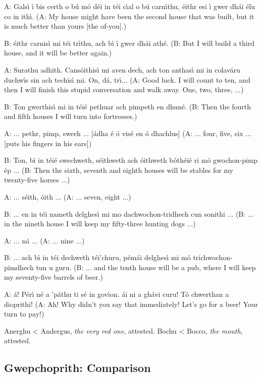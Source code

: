 A: Gals\'{\i} \'{\i} bis certh o b\'{u} m\'{o} d\'{e}i in t\'{e}i c\'{\i}al o b\'{u} carn\'{\i}thu, \'{e}ithr esi \'{\i} gwer dh\'{a}i \'{e}lu co in ith\'{\i}.
(A: My house might have been the second house that was built, but it is much better than yours [the of-you].)

B: \'{e}ithr carnis\'{\i} mi t\'{e}i tr\'{\i}thu, ach b\'{\i} \'{\i} gwer dh\'{a}i ath\'{e}.
(B: But I will build a third house, and it will be better again.)

A: Surathu adhith. Cans\'{o}ithis\'{\i} mi aven dech, ach ton anthas\'{\i} mi in colav\'{a}ru duchw\'{\i}s sin ach techis\'{\i} mi. On, d\'{a}, tr\'{\i}...
(A: Good luck. I will count to ten, and then I will finish this stupid conversation and walk away. One, two, three, ...)

B: Ton gwerthis\'{\i} mi in t\'{e}i\'{e} pethuar ach pimpeth en dhun\'{e}.
(B: Then the fourth and fifth houses I will turn into fortresses.)

A: ... pethr, pimp, swech ... [\'{a}dha \'{e} \'{o} vis\'{e} en \'{o} dhachlus]
(A: ... four, five, six ... [puts his fingers in his ears])

B: Ton, b\'{\i} in t\'{e}i\'{e} swechweth, s\'{e}ithweth ach \'{o}ithweth b\'{o}th\'{e}i\'{e} ri m\'{o} gwochon-pimp \'{e}p ...
(B: Then the sixth, seventh and eighth houses will be stables for my twenty-five horses ...)

A: ... s\'{e}ith, \'{o}ith ...
(A: ... seven, eight ...)

B: ... en in t\'{e}i nameth delghes\'{\i} mi mo dachwochon-tridhech cun sonithi ...
(B: ... in the nineth house I will keep my fifty-three hunting dogs ...)

A: ... n\'{a} ...
(A: ... nine ...)

B: ... ach b\'{\i} in t\'{e}i dechweth t\'{e}i'churu, p\'{e}m\'{a}i delghes\'{\i} mi m\'{o} trichwochon-pimdhech tun u guru.
(B: ... and the tenth house will be a pub, where I will keep my seventy-five barrels of beer.)

A: \'{a}! P\'{e}r\'{\i} n\'{e} a 'p\'{a}thu ti s\'{e} in gov\'{\i}on. \'{a}i ni a gh\'{a}vi curu! T\'{o} chwerthan a dioprithi!
(A: Ah! Why didn't you say that immediately! Let's go for a beer! Your turn to pay!)

Anerghu < Andergus, \textit{the very red one}, attested.
Bochu < Bocco, \textit{the mouth}, attested.

\subsection{Gwepchoprith: Comparison}

